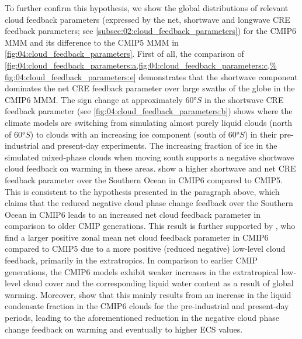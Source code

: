 To further confirm this hypothesis, we show the global distributions of
relevant cloud feedback parameters (expressed by the net, shortwave and
longwave \ac{CRE} feedback parameters; see
\cref{subsec:02:cloud_feedback_parameters}) for the \acs{CMIP}6 \ac{MMM} and
its difference to the \acs{CMIP}5 \ac{MMM} in
\cref{fig:04:cloud_feedback_parameters}. First of all, the comparison of
\cref{fig:04:cloud_feedback_parameters:a,fig:04:cloud_feedback_parameters:c,%
  fig:04:cloud_feedback_parameters:e} demonstrates that the shortwave component
dominates the net \ac{CRE} feedback parameter over large swaths of the globe
in the \acs{CMIP}6 \ac{MMM}. The sign change at approximately $60
\unit{\degree S}$ in the shortwave \ac{CRE} feedback parameter (see
\cref{fig:04:cloud_feedback_parameters:b}) shows where the climate models are
switching from simulating almost purely liquid clouds (north of $60
\unit{\degree S}$) to clouds with an increasing ice component (south of $60
\unit{\degree S}$) in their pre-industrial and present-day experiments. The
increasing fraction of ice in the simulated mixed-phase clouds when moving
south supports a negative shortwave cloud feedback on warming in these areas.
show a higher shortwave and net \ac{CRE} feedback parameter over the Southern
Ocean in \acs{CMIP}6 compared to \acs{CMIP}5. This is consistent to the
hypothesis presented in the paragraph above, which claims that the reduced
negative cloud phase change feedback over the Southern Ocean in \acs{CMIP}6
leads to an increased net cloud feedback parameter in comparison to older
\ac{CMIP} generations. This result is further supported by
\textcite{Zelinka2020}, who find a larger positive zonal mean net cloud
feedback parameter in \acs{CMIP}6 compared to \acs{CMIP}5 due to a more
positive (reduced negative) low‐level cloud feedback, primarily in the
extratropics. In comparison to earlier \acs{CMIP} generations, the
\acs{CMIP}6 models exhibit weaker increases in the extratropical low‐level
cloud cover and the corresponding liquid water content as a result of global
warming. Moreover, \textcite{Zelinka2020} show that this mainly results from
an increase in the liquid condensate fraction in the \acs{CMIP}6 clouds for
the pre-industrial and present‐day periods, leading to the aforementioned
reduction in the negative cloud phase change feedback on warming and
eventually to higher \ac{ECS} values.
